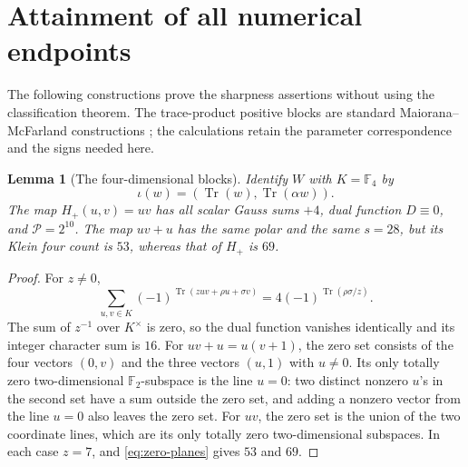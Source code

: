 \documentclass[11pt,a4paper]{article}
\newtheorem{lemma}[theorem]{Lemma}
\theoremstyle{definition}
\theoremstyle{remark}
\numberwithin{equation}{section}
\newcommand{\F}{\mathbb F}
\newcommand{\Tr}{\operatorname{Tr}}
\newcommand{\Pm}{\mathcal P}
\newcommand{\Hp}{H_+}
\begin{document}
\section{Attainment of all numerical endpoints}\label{sec:attain}
The following constructions prove the sharpness assertions without
using the classification theorem. The trace-product positive blocks
are standard Maiorana--McFarland constructions
\citep[Theorem 2(i), p.~314]{CMP18}; the calculations retain the parameter
correspondence and the signs needed here.

\begin{lemma}[The four-dimensional blocks]\label{lem:H}
Identify \(W\) with \(K=\F_4\) by
\begin{equation}\label{eq:iota}
 \iota(w)=(\Tr(w),\Tr(\alpha w)).
\end{equation}
The map \(\Hp(u,v)=uv\) has all scalar Gauss sums \(+4\), dual function \(D\equiv0\),
and \(\Pm=2^{10}\). The map \(uv+u\) has the same polar and the same
\(s=28\), but its Klein four count is \(53\), whereas that of \(\Hp\)
is \(69\).
\end{lemma}
\begin{proof}
For \(z\ne0\),
\[
 \sum_{u,v\in K}(-1)^{\Tr(zuv+\rho u+\sigma v)}
       =4(-1)^{\Tr(\rho\sigma/z)}.
\]
The sum of \(z^{-1}\) over \(K^\times\) is zero, so the dual function
vanishes identically and its integer character sum is \(16\).
For \(uv+u=u(v+1)\), the zero set consists of the four vectors
\((0,v)\) and the three vectors \((u,1)\) with \(u\ne0\).
Its only totally zero two-dimensional \(\F_2\)-subspace is the line
\(u=0\): two distinct nonzero \(u\)'s in the second set have
a sum outside the zero set, and adding a nonzero vector from the
line \(u=0\) also leaves the zero set.
For \(uv\), the zero set is the union of the two coordinate lines,
which are its only totally zero two-dimensional subspaces.
In each case \(z=7\), and \eqref{eq:zero-planes} gives \(53\) and \(69\).
\end{proof}
\end{document}
